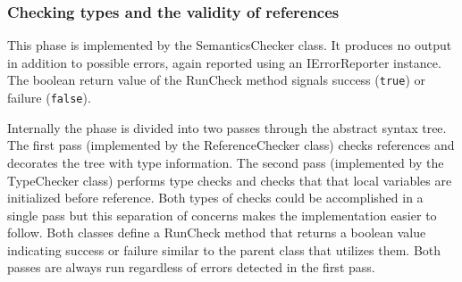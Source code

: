 \documentclass[a4paper,11pt]{article}
\begin{document}
\subsubsection{Checking types and the validity of references}

This phase is implemented by the SemanticsChecker class. It produces no output in addition to possible errors, again reported using an IErrorReporter instance. The boolean return value of the RunCheck method signals success (\verb,true,) or failure (\verb,false,).

Internally the phase is divided into two passes through the abstract syntax tree. The first pass (implemented by the ReferenceChecker class) checks references and decorates the tree with type information. The second pass (implemented by the TypeChecker class) performs type checks and checks that that local variables are initialized before reference. Both types of checks could be accomplished in a single pass but this separation of concerns makes the implementation easier to follow. Both classes define a RunCheck method that returns a boolean value indicating success or failure similar to the parent class that utilizes them. Both passes are always run regardless of errors detected in the first pass.
\end{document}
